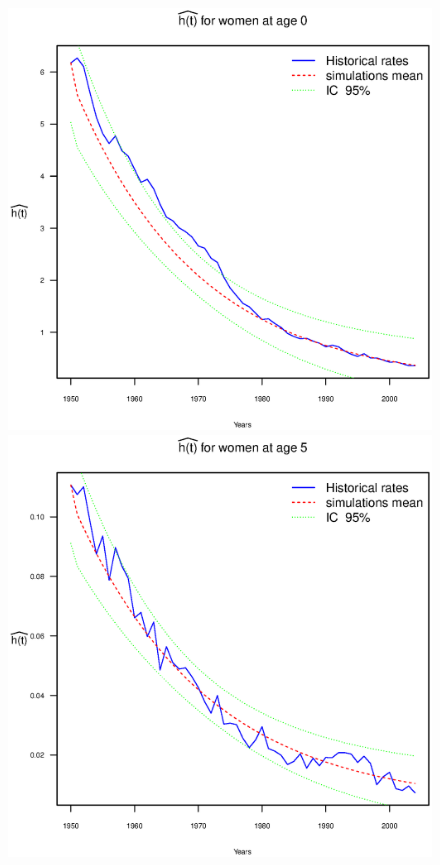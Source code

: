 \documentclass[smallextended]{svjour3}
\begin{document}
\begin{figure}[H]
    \includegraphics{PlotWomen0.eps}
    \includegraphics{PlotWomen5.eps}

\end{figure}
\end{document}
